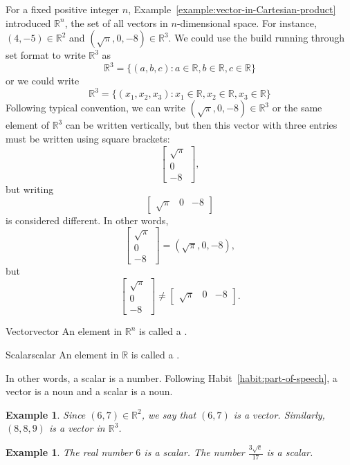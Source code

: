\documentclass{book}
\newcounter{ekcounter}%
\theoremstyle{ekimcustom}
\newtheorem{example}[ekcounter]{Example}
\newcommand\defn[1]{{\color{blue}{\bf #1}}}
\begin{document}
For a fixed positive integer $n$, Example~\ref{example:vector-in-Cartesian-product} introduced $\mathbb{R}^n$, the set of all vectors in $n$-dimensional space. For instance, $(4,-5) \in \mathbb{R}^2$ and $(\sqrt{\pi}, 0,-8) \in \mathbb{R}^3$. We could use the build running through set format to write $\mathbb{R}^3$ as
\[ \mathbb{R}^3 = \{(a,b,c) : a \in \mathbb{R}, b \in \mathbb{R}, c \in \mathbb{R}\}\]
or we could write
\[ \mathbb{R}^3 = \{(x_1,x_2,x_3) : x_1 \in \mathbb{R}, x_2 \in \mathbb{R}, x_3 \in \mathbb{R}\}\]
Following typical convention, we can write $(\sqrt{\pi}, 0,-8) \in \mathbb{R}^3$ or the same element of $\mathbb{R}^3$ can be written vertically, but then this vector with three entries must be written using square brackets:
\[ \left[ \begin{array}{c} \sqrt{\pi}\\0\\-8\end{array}\right], \]
but writing
\[ \left[ \begin{array}{ccc} \sqrt{\pi}&0&-8\end{array}\right] \]
is considered different. In other words,
\[ \left[ \begin{array}{c} \sqrt{\pi}\\0\\-8\end{array}\right] = (\sqrt{\pi}, 0,-8), \]
but
\[ \left[ \begin{array}{c} \sqrt{\pi}\\0\\-8\end{array}\right] \not=  \left[ \begin{array}{ccc} \sqrt{\pi}&0&-8\end{array}\right]. \]
\begin{bdefinition}{Vector}{vector}
An element in $\mathbb{R}^n$ is called a \defn{vector}.
\end{bdefinition}
\begin{bdefinition}{Scalar}{scalar}
An element in $\mathbb{R}$ is called a \defn{scalar}.
\end{bdefinition}
In other words, a scalar is a number. Following Habit~\ref{habit:part-of-speech}, a vector is a noun and a scalar is a noun.
\begin{example}
Since $(6,7) \in \mathbb{R}^2$, we say that $(6,7)$ is a vector. Similarly, $(8,8,9)$ is a vector in $\mathbb{R}^3$.
\end{example}
\begin{example}
The real number $6$ is a scalar. The number $\frac{3\sqrt{e}}{17}$ is a scalar.
\end{example}
\end{document}
